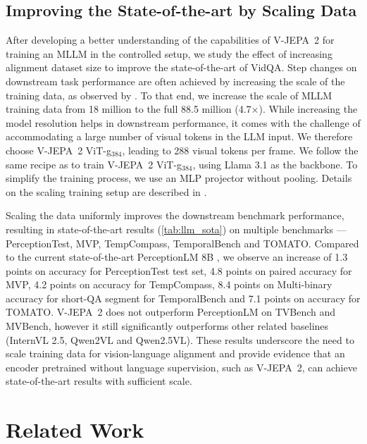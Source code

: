 \documentclass[]{fairmeta}
\newcommand{\model}{V-JEPA~2\xspace}
\begin{document}
\subsection{Improving the State-of-the-art by Scaling Data} 
\label{sec:vqa_sota}

After developing a better understanding of the capabilities of \model for training an MLLM in the controlled setup, we study the effect of increasing alignment dataset size to improve the state-of-the-art of VidQA.
Step changes on downstream task performance are often achieved by increasing the scale of the training data, as observed by \citet{cho2025perceptionlm}.
To that end, we increase the scale of MLLM training data from 18 million to the full 88.5 million (4.7$\times$). 
While increasing the model resolution helps in downstream performance, it comes with the challenge of accommodating a large number of visual tokens in the LLM input.
We therefore choose \model ViT-g$_{384}$, leading to 288 visual tokens per frame. 
We follow the same recipe as \citet{cho2025perceptionlm} to train \model ViT-g$_{384}$, using Llama 3.1 as the backbone. To simplify the training process, we use an MLP projector without pooling. 
Details on the scaling training setup are described in .

Scaling the data uniformly improves the downstream benchmark performance, resulting in state-of-the-art results (\autoref{tab:llm_sota}) on multiple benchmarks --- PerceptionTest, MVP, TempCompass, TemporalBench and TOMATO. 
Compared to the current state-of-the-art PerceptionLM 8B \citep{cho2025perceptionlm}, we observe an increase of 1.3 points on accuracy for PerceptionTest test set, 4.8 points on paired accuracy for MVP, 4.2 points on accuracy for TempCompass, 8.4 points on Multi-binary accuracy for short-QA segment for TemporalBench and 7.1 points on accuracy for TOMATO.
\model does not outperform PerceptionLM on TVBench and MVBench, however it still significantly outperforms other related baselines (InternVL 2.5, Qwen2VL and Qwen2.5VL).
These results underscore the need to scale training data for vision-language alignment and provide evidence that an encoder pretrained without language supervision, such as \model, can achieve state-of-the-art results with sufficient scale.

\section{Related Work}
\label{section:related_work}
\end{document}

